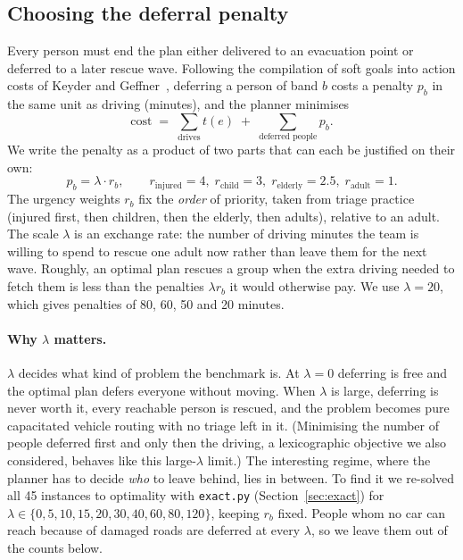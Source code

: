 
\subsection{Choosing the deferral penalty}
\label{sec:lambda}

Every person must end the plan either delivered to an evacuation point or deferred to a later
rescue wave. Following the compilation of soft goals into action costs of Keyder and
Geffner~\cite{keyder2009soft}, deferring a person of band $b$ costs a penalty $p_b$ in the same
unit as driving (minutes), and the planner minimises
\[
  \text{cost} \;=\; \sum_{\text{drives}} t(e) \;+\; \sum_{\text{deferred people}} p_b .
\]
We write the penalty as a product of two parts that can each be justified on their own:
\[
  p_b = \lambda \cdot r_b, \qquad
  r_{\text{injured}} = 4,\; r_{\text{child}} = 3,\; r_{\text{elderly}} = 2.5,\; r_{\text{adult}} = 1 .
\]
The urgency weights $r_b$ fix the \emph{order} of priority, taken from triage practice
(injured first, then children, then the elderly, then adults), relative to an adult. The
scale $\lambda$ is an exchange rate: the number of driving minutes the team is willing to
spend to rescue one adult now rather than leave them for the next wave. Roughly, an optimal
plan rescues a group when the extra driving needed to fetch them is less than the penalties
$\lambda r_b$ it would otherwise pay. We use $\lambda = 20$, which gives penalties of 80, 60, 50 and 20 minutes.

\paragraph{Why $\lambda$ matters.}
$\lambda$ decides what kind of problem the benchmark is. At $\lambda = 0$ deferring is free and
the optimal plan defers everyone without moving. When $\lambda$ is large, deferring is never
worth it, every reachable person is rescued, and the problem becomes pure capacitated vehicle
routing with no triage left in it. (Minimising the number of people deferred first and only then
the driving, a lexicographic objective we also considered, behaves like this
large-$\lambda$ limit.) The
interesting regime, where the planner has to decide \emph{who} to leave behind, lies in
between. To find it we re-solved all 45 instances to optimality with \texttt{exact.py}
(Section~\ref{sec:exact}) for $\lambda \in \{0, 5, 10, 15, 20, 30, 40, 60, 80, 120\}$,
keeping $r_b$ fixed. People whom no car can reach because of damaged roads are deferred at
every $\lambda$, so we leave them out of the counts below.

